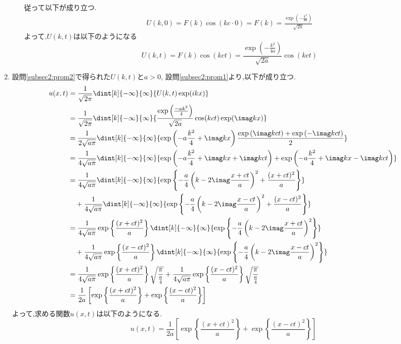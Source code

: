 \documentclass[dvipdfmx,titlepage, 11pt, a4paper]{jsarticle}%
\begin{document}
\begin{enumerate}[(1)]
\begin{enumerate}[(i)]
\begin{align*}
        \end{align*}
        従って以下が成り立つ.
        \begin{align*}
            U(k, 0) = F(k)\cos(kc\cdot 0) = F(k) = \frac{\exp \left(-\frac{k^{2}}{4a}\right)}{\sqrt{2a}}
        \end{align*}
        よって,$U(k, t)$は以下のようになる
        \begin{equation}
            U(k, t) = F(k)\cos(kct) = \frac{\exp \left(-\frac{k^{2}}{4a}\right)}{\sqrt{2a}}\cos(kct)
        \end{equation}
    \end{enumerate}
  \item 設問\eqref{subsec2:prom2}で得られた$U(k, t)$と$a > 0$, 設問\eqref{subsec2:prom1}より,以下が成り立つ.
    \begin{align*}
        u(x, t) &= \frac{1}{\sqrt{2\pi}}\dint[k]{-\infty}{\infty}{U(k, t)\exp(ikx)}\\
        &= \frac{1}{\sqrt{2\pi}}\dint[k]{-\infty}{\infty}{\frac{\exp\left(\frac{-ak^2}{4}\right)}{\sqrt{2a}}\cos(kct)\exp(\imag kx)}\\
        &= \frac{1}{2\sqrt{a\pi}}\dint[k]{-\infty}{\infty}{\exp\left(-a\frac{k^2}{4} + \imag kx\right)\frac{\exp\left(\imag kct\right) + \exp\left(-\imag kct\right)}{2}}\\
        &= \frac{1}{4\sqrt{a\pi}}\dint[k]{-\infty}{\infty}{\exp\left(-a\frac{k^2}{4} + \imag kx + \imag kct\right) + \exp\left(-a\frac{k^2}{4} + \imag kx - \imag kct\right)}\\
        &= \frac{1}{4\sqrt{a\pi}}\dint[k]{-\infty}{\infty}{\exp\left\{-\frac{a}{4}\left(k - 2\imag \frac{x + ct}{a}\right)^2 + \frac{(x + ct)^2}{a}\right\}}\\
        &\quad+ \frac{1}{4\sqrt{a\pi}}\dint[k]{-\infty}{\infty}{\exp\left\{-\frac{a}{4}\left(k - 2\imag \frac{x - ct}{a}\right)^2 + \frac{(x - ct)^2}{a}\right\}}\\
        &= \frac{1}{4\sqrt{a\pi}}\exp\left\{\frac{(x + ct)^2}{a}\right\}\dint[k]{-\infty}{\infty}{\exp\left\{-\frac{a}{4}\left(k - 2\imag \frac{x + ct}{a}\right)^2\right\}}\\
        &\quad+ \frac{1}{4\sqrt{a\pi}}\exp\left\{\frac{(x - ct)^2}{a}\right\}\dint[k]{-\infty}{\infty}{\exp\left\{-\frac{a}{4}\left(k - 2\imag \frac{x - ct}{a}\right)^2\right\}}\\
        &= \frac{1}{4\sqrt{a\pi}}\exp\left\{\frac{(x + ct)^2}{a}\right\}\sqrt{\frac{\pi}{\frac{a}{4}}} + \frac{1}{4\sqrt{a\pi}}\exp\left\{\frac{(x - ct)^2}{a}\right\}\sqrt{\frac{\pi}{\frac{a}{4}}}\\
        &= \frac{1}{2a}\left[\exp\left\{\frac{(x + ct)^2}{a}\right\} + \exp\left\{\frac{(x - ct)^2}{a}\right\}\right]
    \end{align*}
    よって,求める関数$u(x, t)$は以下のようになる.
    \begin{equation*}
        u(x, t) = \frac{1}{2a}\left[\exp\left\{\frac{(x + ct)^2}{a}\right\} + \exp\left\{\frac{(x - ct)^2}{a}\right\}\right]
    \end{equation*}
\end{enumerate}
\end{document}
